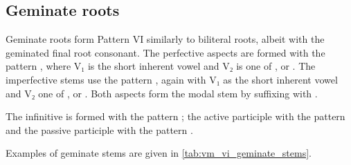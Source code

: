 \documentclass[grammar]{subfiles}
\begin{document}
 
\subsection{Geminate roots}
\label{ssec:vm_vi_geminate_roots}

Geminate roots form Pattern VI similarly to biliteral roots, albeit with the
geminated final root consonant. The perfective aspects are formed with the
pattern , where V₁ is the short inherent vowel and V₂ is one
of ,  or .  The imperfective stems use the pattern
, again with V₁ as the short inherent vowel and V₂ one of
,  or .  Both aspects form the modal stem by suffixing
with . 

The infinitive is formed with the pattern ; the active
participle with the pattern  and the passive participle with the
pattern . 

Examples of geminate stems are given in \cref{tab:vm_vi_geminate_stems}. 

\begin{table}[h!]\small\capstart
  \centering
  \\
  \caption{Pattern VI geminate stems \label{tab:vm_vi_geminate_stems}}
\end{table}
\end{document}
